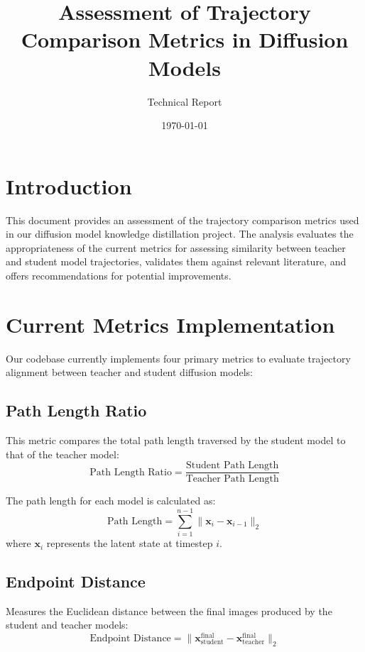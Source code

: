 \documentclass{article}
\title{Assessment of Trajectory Comparison Metrics in Diffusion Models}
\author{Technical Report}
\date{\today}
\begin{document}
\maketitle

\section{Introduction}
This document provides an assessment of the trajectory comparison metrics used in our diffusion model knowledge distillation project. The analysis evaluates the appropriateness of the current metrics for assessing similarity between teacher and student model trajectories, validates them against relevant literature, and offers recommendations for potential improvements.

\section{Current Metrics Implementation}
Our codebase currently implements four primary metrics to evaluate trajectory alignment between teacher and student diffusion models:

\subsection{Path Length Ratio}
This metric compares the total path length traversed by the student model to that of the teacher model:
\begin{equation}
\text{Path Length Ratio} = \frac{\text{Student Path Length}}{\text{Teacher Path Length}}
\end{equation}

The path length for each model is calculated as:
\begin{equation}
\text{Path Length} = \sum_{i=1}^{n-1} \| \mathbf{x}_i - \mathbf{x}_{i-1} \|_2
\end{equation}
where $\mathbf{x}_i$ represents the latent state at timestep $i$.

\subsection{Endpoint Distance}
Measures the Euclidean distance between the final images produced by the student and teacher models:
\begin{equation}
\text{Endpoint Distance} = \| \mathbf{x}_{\text{student}}^{\text{final}} - \mathbf{x}_{\text{teacher}}^{\text{final}} \|_2
\end{equation}
\end{document}
